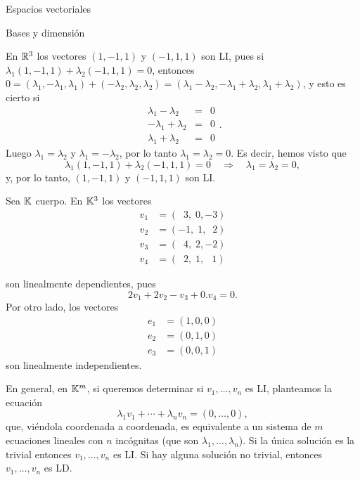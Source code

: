 \begin{chapter}{Espacios vectoriales}
\begin{section}{Bases y dimensi\'on}
\begin{ejemplo*}
    En $\mathbb R^3$  los vectores $(1,-1,1)$ y $(-1,1,1)$ son LI, pues si $\lambda_1(1,-1,1)+\lambda_2(-1,1,1) =0$,  entonces $0= (\lambda_1,-\lambda_1,\lambda_1)+(-\lambda_2,\lambda_2,\lambda_2) =  (\lambda_1-\lambda_2,-\lambda_1+\lambda_2,\lambda_1+\lambda_2)$, y esto es cierto si 
    \begin{equation*}
        \begin{array}{rcl}
        \lambda_1-\lambda_2 &=& 0 \\
        -\lambda_1+\lambda_2 &=& 0 \\
        \lambda_1+\lambda_2 &=& 0 
        \end{array}.
    \end{equation*} 
    Luego $\lambda_1 = \lambda_2$ y $\lambda_1 = -\lambda_2$, por lo tanto $\lambda_1 = \lambda_2 =0$. Es decir,  hemos visto que 
    $$
    \lambda_1(1,-1,1)+\lambda_2(-1,1,1) =0 \quad \Rightarrow \quad\lambda_1 = \lambda_2 =0,
    $$
    y, por lo tanto,  $(1,-1,1)$ y $(-1,1,1)$ son LI.
\end{ejemplo*}

\begin{ejemplo*} Sea $\mathbb K$  cuerpo. En $\mathbb K^3$ los vectores
    \begin{align*}
    v_1 &= (\;\;3,\;0,-3) \\
    v_2 &= (-1,\;1,\;\;2) \\
    v_3 &= (\;\;4,\;2,-2) \\
    v_4 &= (\;\;2,\;1,\,\;\;1)
    \end{align*}
    
    son linealmente dependientes, pues
    $$
    2v_1+2v_2 -v_3 +0.v_4 =0.
    $$
    Por otro lado, los vectores
    \begin{align*}
    e_1 &= (1,0,0) \\
    e_2 &= (0,1,0) \\
    e_3 &= (0,0,1) 
    \end{align*}
    son linealmente independientes.
\end{ejemplo*}


\begin{observacion*}
    En  general,  en $\mathbb K^m$, si queremos determinar si  $v_1,\ldots,v_n$ es LI, planteamos la ecuación  
    \begin{equation*}
    \lambda_1v_1+\cdots+\lambda_nv_n=(0,\ldots,0),
    \end{equation*}
    que, viéndola coordenada a coordenada, es equivalente a un sistema de $m$ ecuaciones lineales con  $n$ incógnitas (que son $\lambda_1,\ldots,\lambda_n$). Si  la única solución es la trivial entonces $v_1,\ldots,v_n$ es LI. Si hay alguna solución no trivial, entonces $v_1,\ldots,v_n$ es LD. 
\end{observacion*}
 

\end{section}
\end{chapter}

